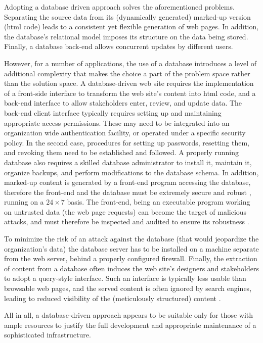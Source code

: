 \documentclass[10pt]{article}
\begin{document}
Adopting a database driven approach solves
the aforementioned problems.
Separating the source data from its (dynamically generated)
marked-up version ({\sc html} code) leads to a consistent
yet flexible generation of web pages.
In addition, the database's relational model imposes
its structure on the data being stored.
Finally, a database back-end allows concurrent updates by
different users.

However, for a number of applications, the use of a database
introduces a level of additional complexity that
makes the choice a part of
the problem space rather than the solution space.
A database-driven web site requires the implementation of a
front-side interface to transform the web site's content into
{\sc html} code, and a back-end interface to allow stakeholders
enter, review, and update data.
The back-end client interface typically requires setting up
and maintaining appropriate access permissions.
These may need to be integrated into an organization wide authentication 
facility, or operated under a specific security policy.
In the second case, procedures for setting up passwords,
resetting them, and revoking them need to be established and followed.
A properly running database also requires a skilled database
administrator to install it, maintain it, organize backups,
and perform modifications to the database schema.
In addition, marked-up content is generated by a front-end
program accessing the database, therefore the front-end and the database
must be extremely secure and robust \cite{VG01}, running on a $24 \times 7$ basis.
The front-end, being an executable program working on
untrusted data (the web page requests) can become the target of
malicious attacks,
and must therefore be inspected and audited to ensure its robustness \cite{YHDM04}.

To minimize the risk of an attack against the database
(that would jeopardize the organization's data)
the database server has to be installed on a machine separate
from the web server, behind a properly configured firewall.
Finally, the extraction of content from a database often
induces the web site's designers and stakeholders to adopt a
query-style interface.
Such an interface is typically less usable than browsable web pages,
and the served content is often ignored by search engines,
leading to reduced visibility
of the (meticulously structured) content \cite{DEEP_WEB, JP04}.

All in all, a database-driven approach appears to be suitable
only for those with ample resources to justify the full
development and appropriate maintenance of a sophisticated infrastructure.
\end{document}
